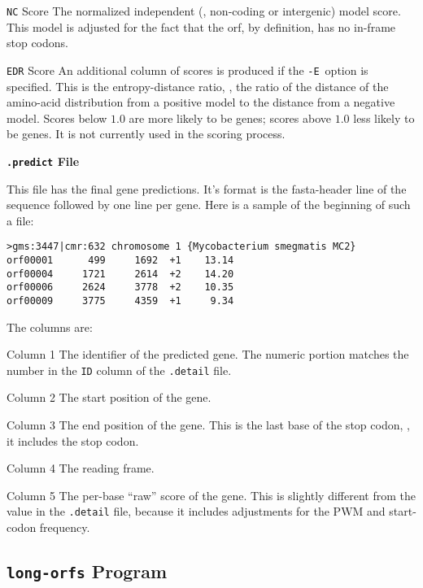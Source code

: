 \documentclass[fleqn,titlepage,11pt]{article}
\def\Pg#1{\texttt{#1}}
\begin{document}
\item[\Pg{NC} Score]
  The normalized independent (\ie, non-coding or intergenic) model score.  This model
  is adjusted for the fact that the orf, by definition, has no in-frame stop codons.

\item[\Pg{EDR} Score]
  An additional column of scores is produced if the \Pg{-E}~option
  is specified.
  This is the entropy-distance ratio, \ie, the ratio of the distance
  of the amino-acid distribution from a positive model to the distance
  from a negative model.  Scores below $1.0$ are more likely to be genes;
  scores above $1.0$ less likely to be genes.
  It is not currently used in the scoring process.
\el

\smallskip
\noindent\textbf{\Pg{.predict} File}
\smallskip

This file has the final gene predictions.  It's format is the fasta-header
line of the sequence followed by one line per gene.  Here is a sample of the
beginning of such a file:
\BSV\begin{verbatim}
>gms:3447|cmr:632 chromosome 1 {Mycobacterium smegmatis MC2}
orf00001      499     1692  +1    13.14
orf00004     1721     2614  +2    14.20
orf00006     2624     3778  +2    10.35
orf00009     3775     4359  +1     9.34
\end{verbatim}\ESV
The columns are:
\RaggedRight
\item[Column 1]
  The identifier of the predicted gene.  The numeric portion matches the
  number in the \Pg{ID} column of the \Pg{.detail} file.

\item[Column 2]
  The start position of the gene.

\item[Column 3]
  The end position of the gene.  This is the last base of the stop codon, \ie,
  it includes the stop codon.

\item[Column 4]
  The reading frame.

\item[Column 5]
  The per-base ``raw'' score of the gene.  This is slightly different from the
  value in the \Pg{.detail} file, because it includes adjustments for the
  PWM and start-codon frequency.
\el

\subsection{\Pg{long-orfs} Program}
\end{document}
